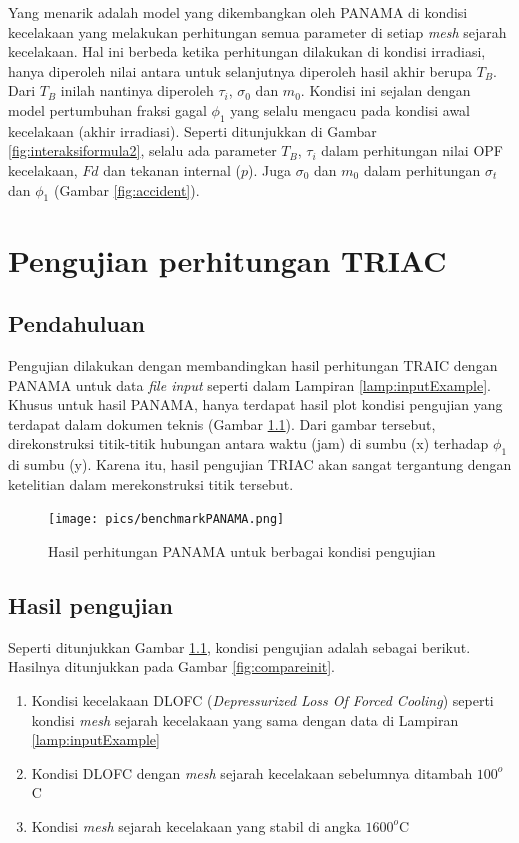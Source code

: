 \documentclass[a4paper,11pt]{report}
\begin{document}
Yang menarik adalah model yang dikembangkan oleh PANAMA di kondisi kecelakaan yang melakukan perhitungan semua parameter di setiap \textit{mesh} sejarah kecelakaan. Hal ini berbeda ketika perhitungan dilakukan di kondisi irradiasi, hanya diperoleh nilai antara untuk selanjutnya diperoleh hasil akhir berupa $T_B$. Dari $T_B$ inilah nantinya diperoleh $\tau_i$, $\sigma_0$ dan $m_0$. Kondisi ini sejalan dengan model pertumbuhan fraksi gagal $\phi_1$ yang selalu mengacu pada kondisi awal kecelakaan (akhir irradiasi). Seperti ditunjukkan di Gambar \ref{fig:interaksiformula2}, selalu ada parameter $T_B$, $\tau_i$ dalam perhitungan nilai OPF kecelakaan, $Fd$ dan tekanan internal ($p$). Juga $\sigma_0$ dan $m_0$ dalam perhitungan $\sigma_t$ dan $\phi_1$ (Gambar \ref{fig:accident}).

\chapter{Pengujian perhitungan TRIAC}
\section{Pendahuluan}
Pengujian dilakukan dengan membandingkan hasil perhitungan TRAIC dengan PANAMA untuk data \textit{file input} seperti dalam Lampiran \ref{lamp:inputExample}. Khusus untuk hasil PANAMA, hanya terdapat hasil plot kondisi pengujian yang terdapat dalam dokumen teknis \cite{report1} (Gambar \ref{fig:benchmark1}). Dari gambar tersebut, direkonstruksi titik-titik hubungan antara waktu (jam) di sumbu (x) terhadap $\phi_1$ di sumbu (y). Karena itu, hasil pengujian TRIAC akan sangat tergantung dengan ketelitian dalam merekonstruksi titik tersebut. 

\begin{figure}[h!]
  \begin{center}
    \texttt{[image: pics/benchmarkPANAMA.png]}
    \caption[Hasil perhitungan PANAMA untuk berbagai kondisi pengujian]{Hasil perhitungan PANAMA untuk berbagai kondisi pengujian \cite{report1}}
    \label{fig:benchmark1}
  \end{center}
\end{figure}

\section{Hasil pengujian}
Seperti ditunjukkan Gambar \ref{fig:benchmark1}, kondisi pengujian adalah sebagai berikut. Hasilnya ditunjukkan pada Gambar \ref{fig:compareinit}.
\begin{enumerate}
  \item Kondisi kecelakaan DLOFC (\textit{Depressurized Loss Of Forced Cooling}) seperti kondisi \textit{mesh} sejarah kecelakaan yang sama dengan data di Lampiran \ref{lamp:inputExample}
  \item Kondisi DLOFC dengan \textit{mesh} sejarah kecelakaan sebelumnya ditambah $100^o$C
  \item Kondisi \textit{mesh} sejarah kecelakaan yang stabil di angka $1600^o$C
\end{enumerate}
\end{document}
